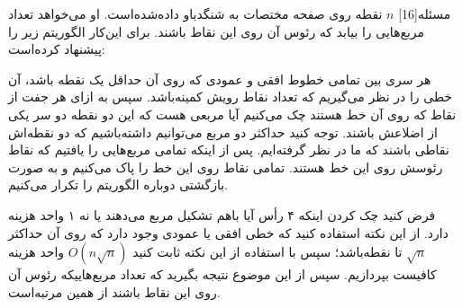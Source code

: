 
‌مسئله[16]
$n$ 
نقطه روی صفحه مختصات به شنگدباو داده‌شده‌است. او می‌خواهد تعداد مربع‌هایی را بیابد که رئوس آن روی این نقاط باشند.
برای این‌کار الگوریتم زیر را پیشنهاد کرده‌است:

هر سری بین تمامی خطوط افقی و عمودی که روی آن حداقل یک نقطه باشد، آن خطی را در نظر می‌گیریم که تعداد نقاط رویش کمینه‌باشد.
سپس به ازای هر جفت از نقاط که روی آن خط هستند چک می‌کنیم آیا مربعی هست که این دو نقطه دو سر یکی از اضلاعش باشند.
توجه کنید حداکثر دو مربع می‌توانیم داشته‌باشیم که دو نقطه‌اش نقاطی باشند که ما در نظر گرفته‌ایم.
پس از اینکه تمامی مربع‌هایی را یافتیم که نقاط رئوسش روی این خط هستند. تمامی نقاط روی این خط را پاک می‌کنیم و به صورت بازگشتی دو‌باره الگوریتم را تکرار می‌کنیم.

فرض کنید چک کردن اینکه ۴ رأس آیا باهم تشکیل مربع می‌دهند یا نه ۱ واحد هزینه‌ دارد. از این نکته استفاده کنید که خطی افقی یا عمودی وجود دارد که روی آن حداکثر 
$\sqrt{n}$
تا نقطه‌باشد؛ سپس با استفاده از این نکته ثابت کنید 
$O(n\sqrt{n})$
واحد هزینه کافیست بپردازیم. سپس از این موضوع نتیجه بگیرید که تعداد مربع‌هاییکه رئوس آن روی
این نقاط باشند از همین مرتبه‌است.


